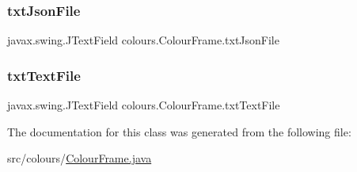 \subsubsection{\texorpdfstring{txt\+Json\+File}{txtJsonFile}}
{\footnotesize\ttfamily javax.\+swing.\+J\+Text\+Field colours.\+Colour\+Frame.\+txt\+Json\+File\hspace{0.3cm}{\ttfamily [private]}}

\mbox{\label{classcolours_1_1_colour_frame_a8acb908d5dbadca9e110960051340977}} 
\subsubsection{\texorpdfstring{txt\+Text\+File}{txtTextFile}}
{\footnotesize\ttfamily javax.\+swing.\+J\+Text\+Field colours.\+Colour\+Frame.\+txt\+Text\+File\hspace{0.3cm}{\ttfamily [private]}}



The documentation for this class was generated from the following file\+:\begin{DoxyCompactItemize}
\item 
src/colours/\hyperlink{_colour_frame_8java}{Colour\+Frame.\+java}\end{DoxyCompactItemize}
